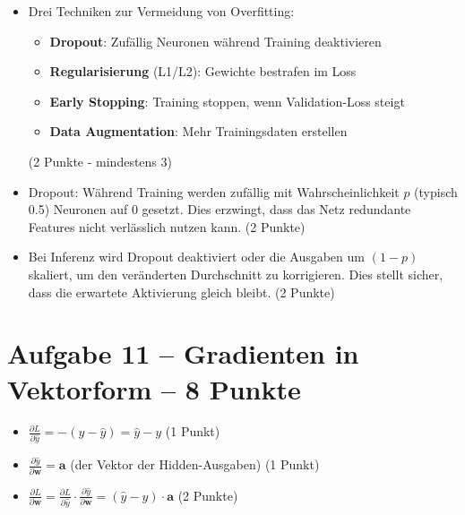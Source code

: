 \begin{itemize}
\item [b)] Drei Techniken zur Vermeidung von Overfitting:
\begin{itemize}
  \item \textbf{Dropout}: Zufällig Neuronen während Training deaktivieren
  \item \textbf{Regularisierung} (L1/L2): Gewichte bestrafen im Loss
  \item \textbf{Early Stopping}: Training stoppen, wenn Validation-Loss steigt
  \item \textbf{Data Augmentation}: Mehr Trainingsdaten erstellen
\end{itemize}
(2 Punkte - mindestens 3)
\end{itemize}

\begin{itemize}
\item [c)] Dropout: Während Training werden zufällig mit Wahrscheinlichkeit $p$ (typisch 0.5) Neuronen auf 0 gesetzt. Dies erzwingt, dass das Netz redundante Features nicht verlässlich nutzen kann. (2 Punkte)
\end{itemize}

\begin{itemize}
\item [d)] Bei Inferenz wird Dropout deaktiviert oder die Ausgaben um $(1-p)$ skaliert, um den veränderten Durchschnitt zu korrigieren. Dies stellt sicher, dass die erwartete Aktivierung gleich bleibt. (2 Punkte)
\end{itemize}

\newpage

\section*{Aufgabe 11 -- Gradienten in Vektorform -- 8 Punkte}

\begin{itemize}
\item [a)] $\frac{\partial L}{\partial \hat{y}} = -(y - \hat{y}) = \hat{y} - y$ (1 Punkt)
\end{itemize}

\begin{itemize}
\item [b)] $\frac{\partial \hat{y}}{\partial \mathbf{w}} = \mathbf{a}$ (der Vektor der Hidden-Ausgaben) (1 Punkt)
\end{itemize}

\begin{itemize}
\item [c)] $\frac{\partial L}{\partial \mathbf{w}} = \frac{\partial L}{\partial \hat{y}} \cdot \frac{\partial \hat{y}}{\partial \mathbf{w}} = (\hat{y} - y) \cdot \mathbf{a}$ (2 Punkte)
\end{itemize}

